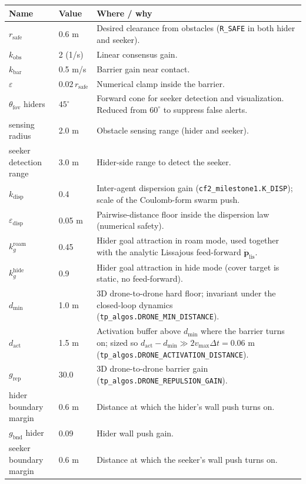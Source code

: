 \documentclass[11pt,a4paper]{article}
\newcommand{\code}[1]{\texttt{#1}}
\newcommand{\vect}[1]{\mathbf{#1}}
\begin{document}
\begin{longtable}{p{4.5cm}p{2.2cm}p{8cm}}
\toprule
\textbf{Name} & \textbf{Value} & \textbf{Where / why} \\
\midrule
$r_\mathrm{safe}$ & 0.6 m & Desired clearance from obstacles
(\code{R\_SAFE} in both hider and seeker). \\
$k_\mathrm{obs}$ & 2 (1/s) & Linear consensus gain. \\
$k_\mathrm{bar}$ & 0.5 m/s & Barrier gain near contact. \\
$\varepsilon$ & $0.02\,r_\mathrm{safe}$ & Numerical clamp inside the barrier. \\
$\theta_\mathrm{fov}$ hiders & $45^\circ$ & Forward cone for seeker detection
and visualization. Reduced from $60^\circ$ to suppress false alerts. \\
sensing radius & 2.0 m & Obstacle sensing range (hider and seeker). \\
seeker detection range & 3.0 m & Hider-side range to detect the seeker. \\
$k_\mathrm{disp}$ & 0.4 & Inter-agent dispersion gain
(\code{cf2\_milestone1.K\_DISP}); scale of the Coulomb-form swarm push. \\
$\varepsilon_\mathrm{disp}$ & 0.05 m & Pairwise-distance floor inside the
dispersion law (numerical safety). \\
$k_g^\mathrm{roam}$ & 0.45 & Hider goal attraction in roam mode, used
together with the analytic Lissajous feed-forward
$\dot{\vect{p}}_\mathrm{lis}$. \\
$k_g^\mathrm{hide}$ & 0.9 & Hider goal attraction in hide mode (cover target
is static, no feed-forward). \\
$d_\mathrm{min}$ & 1.0 m & 3D drone-to-drone hard floor; invariant under the
closed-loop dynamics (\code{tp\_algos.DRONE\_MIN\_DISTANCE}). \\
$d_\mathrm{act}$ & 1.5 m & Activation buffer above $d_\mathrm{min}$ where the
barrier turns on; sized so $d_\mathrm{act} - d_\mathrm{min} \gg
2 v_\mathrm{max} \Delta t = 0.06$ m
(\code{tp\_algos.DRONE\_ACTIVATION\_DISTANCE}). \\
$g_\mathrm{rep}$ & 30.0 & 3D drone-to-drone barrier gain
(\code{tp\_algos.DRONE\_REPULSION\_GAIN}). \\
hider boundary margin & 0.6 m & Distance at which the hider's wall push turns on. \\
$g_\mathrm{bnd}$ hider & 0.09 & Hider wall push gain. \\
seeker boundary margin & 0.6 m & Distance at which the seeker's wall push turns on. \\

\end{longtable}
\end{document}
